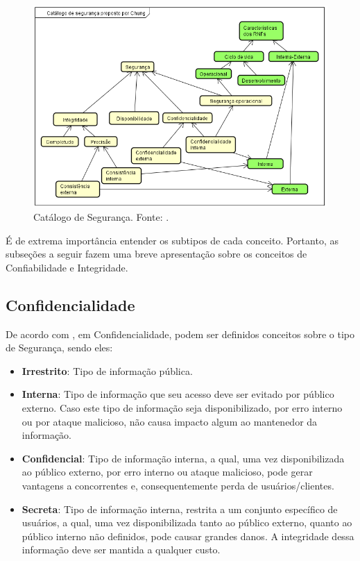 \begin{figure}[h!]
	\centering
	\includegraphics[keepaspectratio=true,scale=0.9]{figuras/catalogoSegurancaChung.PNG}
	\caption{Catálogo de Segurança. Fonte: \cite{chung2012non}.}
	\label{catalogoSegurancaChung}
\end{figure}

É de extrema importância entender os subtipos de cada conceito. Portanto, as subseções a seguir fazem uma breve apresentação sobre os conceitos de Confiabilidade e Integridade. 

\subsection{Confidencialidade}
\label{subsec:confidencialidade}

De acordo com \cite{reis10classificaccao}, em Confidencialidade, podem ser definidos conceitos sobre o tipo de Segurança, sendo eles:

\begin{itemize}
	\item \textbf{Irrestrito}: Tipo de informação pública. 
	
	\item \textbf{Interna}: Tipo de informação que seu acesso deve ser evitado por público externo. Caso este tipo de informação seja disponibilizado, por erro interno ou por ataque malicioso, não causa impacto algum ao mantenedor da informação.
	
	\item \textbf{Confidencial}: Tipo de informação interna, a qual, uma vez disponibilizada ao público externo, por erro interno ou ataque malicioso, pode gerar vantagens a concorrentes e, consequentemente perda de usuários/clientes. 
	
	\item \textbf{Secreta}: Tipo de informação interna, restrita a um conjunto específico de usuários, a qual, uma vez disponibilizada tanto ao público externo, quanto ao público interno não definidos, pode causar grandes danos. A integridade dessa informação deve ser mantida a qualquer custo.
\end{itemize} 

